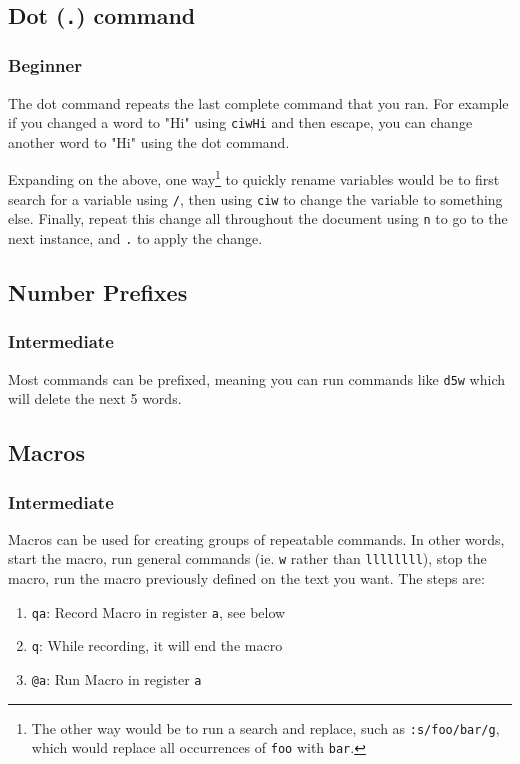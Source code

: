 \documentclass[11pt]{article}
\begin{document}
\subsection{Dot (\texttt{.}) command}
\label{sec:org398ae1f}
\subsubsection{Beginner}
\label{sec:orgbcd70b1}
The dot command repeats the last complete command that you ran. For example if
you changed a word to "Hi" using \texttt{ciwHi} and then escape, you can change another
word to "Hi" using the dot command.

Expanding on the above, one way\footnote{The other way would be to run a search and replace, such as 
\texttt{:s/foo/bar/g}, which would replace all occurrences of \texttt{foo} with \texttt{bar}.} to quickly rename variables would be to
first search for a variable using \texttt{/}, then using \texttt{ciw} to change the variable
to something else. Finally, repeat this change all throughout the document using
\texttt{n} to go to the next instance, and \texttt{.} to apply the change.
\subsection{Number Prefixes}
\label{sec:org9c30c80}
\subsubsection{Intermediate}
\label{sec:org484b13e}
Most commands can be prefixed, meaning you can run commands like \texttt{d5w} which
will delete the next 5 words.
\subsection{Macros}
\label{sec:org0300354}
\subsubsection{Intermediate}
\label{sec:orgb394d34}
Macros can be used for creating groups of repeatable commands. In other words,
start the macro, run general commands (ie. \texttt{w} rather than \texttt{llllllll}), stop the
macro, run the macro previously defined on the text you want. The steps are:

\begin{enumerate}
\item \texttt{qa}: Record Macro in register \texttt{a}, see below
\item \texttt{q}: While recording, it will end the macro
\item \texttt{@a}: Run Macro in register \texttt{a}
\end{enumerate}
\end{document}
